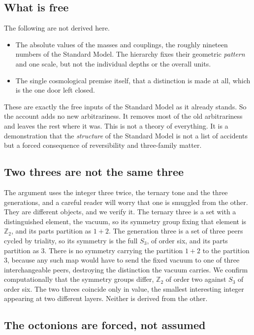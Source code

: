 \subsection{What is free}

The following are not derived here.

\begin{itemize}
  \item The absolute values of the masses and couplings, the roughly nineteen numbers of the Standard Model. The
  hierarchy fixes their geometric \emph{pattern} and one scale, but not the individual depths or the overall units.
  \item The single cosmological premise itself, that a distinction is made at all, which is the one door left closed.
\end{itemize}

These are exactly the free inputs of the Standard Model as it already stands. So the account adds no new arbitrariness.
It removes most of the old arbitrariness and leaves the rest where it was. This is not a theory of everything. It is a
demonstration that the \emph{structure} of the Standard Model is not a list of accidents but a forced consequence of
reversibility and three-family matter.

\subsection{Two threes are not the same three}

The argument uses the integer three twice, the ternary tone and the three generations, and a careful reader will worry
that one is smuggled from the other. They are different objects, and we verify it. The ternary three is a set with a
distinguished element, the vacuum, so its symmetry group fixing that element is $\mathbb{Z}_2$, and its parts partition
as $1 + 2$. The generation three is a set of three peers cycled by triality, so its symmetry is the full $S_3$, of order
six, and its parts partition as $3$. There is no symmetry carrying the partition $1 + 2$ to the partition $3$, because
any such map would have to send the fixed vacuum to one of three interchangeable peers, destroying the distinction the
vacuum carries. We confirm computationally that the symmetry groups differ, $\mathbb{Z}_2$ of order two against $S_3$
of order six. The two threes coincide only in value, the smallest interesting integer appearing at two different
layers. Neither is derived from the other.

\subsection{The octonions are forced, not assumed}

